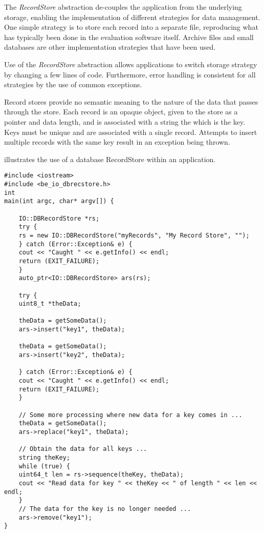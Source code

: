 The {\em RecordStore} abstraction de-couples the application from
the underlying storage, enabling the implementation of different strategies for
data management. One simple strategy is to store each record into a separate
file, reproducing what has typically been done in the evaluation software
itself. Archive files and small databases are other implementation strategies
that have been used.

Use of the {\em RecordStore} abstraction allows applications to switch
storage strategy by changing a few lines of code. Furthermore, error handling
is consistent for all strategies by the use of common exceptions.

Record stores provide no semantic meaning to the nature of the data that passes
through the store. Each record is an opaque object, given to the store as a
pointer and data length, and is associated with a string the which is the key.
Keys must
be unique and are associated with a single record. Attempts to insert multiple
records with the same key result in an exception being thrown.

 illustrates the use of a database RecordStore
within an application.

\begin{lstlisting}[caption={Using a RecordStore}, label=recordstoreuse]
#include <iostream>
#include <be_io_dbrecstore.h>
int
main(int argc, char* argv[]) {

    IO::DBRecordStore *rs;
    try {
	rs = new IO::DBRecordStore("myRecords", "My Record Store", "");
    } catch (Error::Exception& e) {
	cout << "Caught " << e.getInfo() << endl;
	return (EXIT_FAILURE);
    }
    auto_ptr<IO::DBRecordStore> ars(rs);

    try {
	uint8_t *theData;

	theData = getSomeData();
	ars->insert("key1", theData);

	theData = getSomeData();
	ars->insert("key2", theData);

    } catch (Error::Exception& e) {
	cout << "Caught " << e.getInfo() << endl;
	return (EXIT_FAILURE);
    }

    // Some more processing where new data for a key comes in ...
    theData = getSomeData();
    ars->replace("key1", theData);
  
    // Obtain the data for all keys ...
    string theKey;
    while (true) {
	uint64_t len = rs->sequence(theKey, theData);
	cout << "Read data for key " << theKey << " of length " << len << endl;
    }
    // The data for the key is no longer needed ...
    ars->remove("key1");
}
\end{lstlisting}

